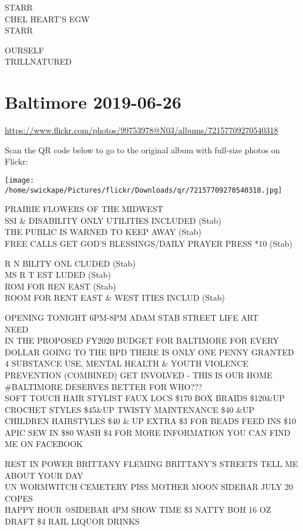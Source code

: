 \documentclass[10pt,letterpaper]{article}
\begin{document}
STARR\\
CHEL HEART'S EGW\\
STARR

OURSELF\\
TRILLNATURED
\pagebreak

\section*{Baltimore 2019-06-26}

\url{https://www.flickr.com/photos/99753978@N03/albums/72157709270540318}

Scan the QR code below to go to the original album with full-size photos on Flickr:

\texttt{[image: /home/swickape/Pictures/flickr/Downloads/qr/72157709270540318.jpg]}
\pagebreak

PRAIRIE FLOWERS OF THE MIDWEST\\
SSI \& DISABILITY ONLY UTILITIES INCLUDED (Stab)\\
THE PUBLIC IS WARNED TO KEEP AWAY (Stab)\\
FREE CALLS GET GOD'S BLESSINGS/DAILY PRAYER PRESS *10 (Stab)

R N BILITY ONL CLUDED (Stab)\\
MS R T EST LUDED (Stab)\\
ROM FOR REN EAST (Stab)\\
ROOM FOR RENT EAST \& WEST ITIES INCLUD (Stab)

OPENING TONIGHT 6PM{-}8PM ADAM STAB STREET LIFE ART\\
NEED\\
IN THE PROPOSED FY2020 BUDGET FOR BALTIMORE FOR EVERY DOLLAR GOING TO THE BPD THERE IS ONLY ONE PENNY GRANTED 4 SUBSTANCE USE, MENTAL HEALTH \& YOUTH VIOLENCE PREVENTION (COMBINED) GET INVOLVED {-} THIS IS OUR HOME \#BALTIMORE DESERVES BETTER FOR WHO???\\
SOFT TOUCH HAIR STYLIST FAUX LOCS \$170 BOX BRAIDS \$120\&UP CROCHET STYLES \$45\&UP TWISTY MAINTENANCE \$40 \&UP CHILDREN HAIRSTYLES \$40 \& UP EXTRA \$3 FOR BEADS FEED INS \$10 APIC SEW IN \$80 WASH \$4 FOR MORE INFORMATION YOU CAN FIND ME ON FACEBOOK

REST IN POWER BRITTANY FLEMING BRITTANY'S STREETS TELL ME ABOUT YOUR DAY\\
UN WORMWITCH CEMETERY PISS MOTHER MOON SIDEBAR JULY 20\\
COPES\\
HAPPY HOUR @SIDEBAR 4PM SHOW TIME \$3 NATTY BOH 16 OZ DRAFT \$4 RAIL LIQUOR DRINKS
\end{document}
